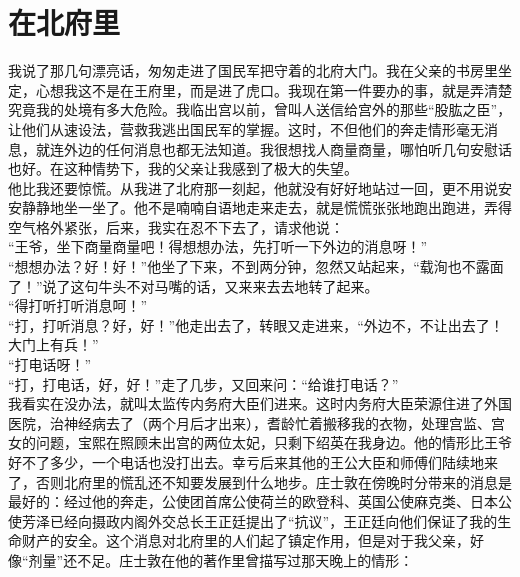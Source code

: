 \fancyhead[RO]{} %
\fancyhead[LE]{} %
\chapter*{在北府里}
\thispagestyle{empty}
我说了那几句漂亮话，匆匆走进了国民军把守着的北府大门。我在父亲的书房里坐定，心想我这不是在王府里，而是进了虎口。我现在第一件要办的事，就是弄清楚究竟我的处境有多大危险。我临出宫以前，曾叫人送信给宫外的那些“股肱之臣”，让他们从速设法，营救我逃出国民军的掌握。这时，不但他们的奔走情形毫无消息，就连外边的任何消息也都无法知道。我很想找人商量商量，哪怕听几句安慰话也好。在这种情势下，我的父亲让我感到了极大的失望。\\

他比我还要惊慌。从我进了北府那一刻起，他就没有好好地站过一回，更不用说安安静静地坐一坐了。他不是喃喃自语地走来走去，就是慌慌张张地跑出跑进，弄得空气格外紧张，后来，我实在忍不下去了，请求他说：\\

“王爷，坐下商量商量吧！得想想办法，先打听一下外边的消息呀！”\\

“想想办法？好！好！”他坐了下来，不到两分钟，忽然又站起来，“载洵也不露面了！”说了这句牛头不对马嘴的话，又来来去去地转了起来。\\

“得打听打听消息呵！”\\

“打，打听消息？好，好！”他走出去了，转眼又走进来，“外边不，不让出去了！大门上有兵！”\\

“打电话呀！”\\

“打，打电话，好，好！”走了几步，又回来问：“给谁打电话？”\\

我看实在没办法，就叫太监传内务府大臣们进来。这时内务府大臣荣源住进了外国医院，治神经病去了（两个月后才出来），耆龄忙着搬移我的衣物，处理宫监、宫女的问题，宝熙在照顾未出宫的两位太妃，只剩下绍英在我身边。他的情形比王爷好不了多少，一个电话也没打出去。幸亏后来其他的王公大臣和师傅们陆续地来了，否则北府里的慌乱还不知要发展到什么地步。庄士敦在傍晚时分带来的消息是最好的：经过他的奔走，公使团首席公使荷兰的欧登科、英国公使麻克类、日本公使芳泽已经向摄政内阁外交总长王正廷提出了“抗议”，王正廷向他们保证了我的生命财产的安全。这个消息对北府里的人们起了镇定作用，但是对于我父亲，好像“剂量”还不足。庄士敦在他的著作里曾描写过那天晚上的情形：\\

